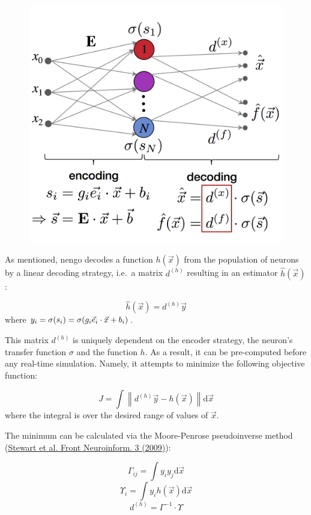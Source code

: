 \documentclass{report}
\makeatletter
\def\maxwidth{\ifdim\Gin@nat@width>\linewidth\linewidth
    \else\Gin@nat@width\fi}
\let\Oldincludegraphics\includegraphics
\renewcommand{\includegraphics}[1]{\Oldincludegraphics[width=.8\maxwidth]{#1}}
\makeatother
\begin{document}
\begin{figure}
\centering
\includegraphics{Fig1.png}
\caption{}
\end{figure}

As mentioned, nengo decodes a function \(h(\vec x)\) from the population
of neurons by a linear decoding strategy, i.e.~a matrix \(d^{(h)}\)
resulting in an estimator \(\hat h(\vec x)\):

\[\hat h(\vec x) = d^{(h)} \vec y\] where
\(y_i = \sigma(s_i) = \sigma(g_i \vec e_i \cdot \vec x + b_i)\\\).

This matrix \(d^{(h)}\) is uniquely dependent on the encoder strategy,
the neuron's transfer function \(\sigma\) and the function \(h\). As a
result, it can be pre-computed before any real-time simulation. Namely,
it attempts to minimize the following objective function:

\[J = \int \left\lVert d^{(h)}\vec y - h(\vec x)\right\rVert \mathrm{d}\vec x\]
where the integral is over the desired range of values of \(\vec x\).

The minimum can be calculated via the Moore-Penrose pseudoinverse method
(\href{https://doi.org/10.3389/neuro.11.007.2009}{Stewart et al. Front
Neuroinform. 3 (2009)}):

\[ 
\Gamma_{ij} = \int y_i y_j \mathrm{d}\vec x
\] \[
\Upsilon_i = \int y_i h(\vec x) \mathrm{d} \vec x
\] \[
d^{(h)} = \Gamma^{-1} \cdot \Upsilon
\]
\end{document}
